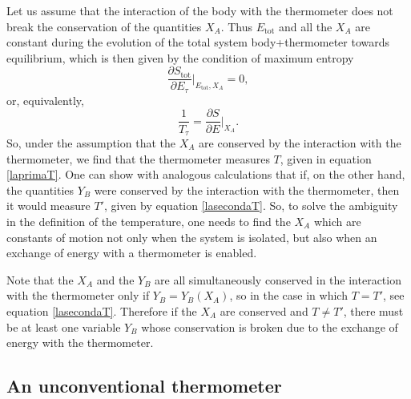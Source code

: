 \documentclass[twocolumn,usenatbib]{mnras2}
\begin{document}
Let us assume that the interaction of the body with the thermometer does not break the conservation of the quantities $X_A$. Thus $E_{\text{tot}}$ and all the $X_A$ are constant during the evolution of the total system body+thermometer towards equilibrium, which is then given by the condition of maximum entropy 
\begin{equation}
\dfrac{\partial S_{\text{tot}}}{\partial E_\tau}\bigg|_{E_{\text{tot}},X_A} =0,
\end{equation}
or, equivalently,
\begin{equation}
\dfrac{1}{T_\tau} = \dfrac{\partial S}{\partial E} \bigg|_{X_A}. 
\end{equation}  
So, under the assumption that the $X_A$ are conserved by the interaction with the thermometer, we find that the thermometer measures $T$, given in equation \eqref{laprimaT}. One can show with analogous calculations that if, on the other hand, the quantities $Y_B$ were conserved by the interaction with the thermometer, then it would measure $T'$, given by equation \eqref{lasecondaT}. So, to solve the ambiguity in the definition of the temperature, one needs to find the $X_A$ which are constants of motion not only when the system is isolated, but also when an exchange of energy with a thermometer is enabled.

Note that the $X_A$ and the $Y_B$ are all simultaneously conserved in the interaction with the thermometer only if $Y_B = Y_B (X_A)$, so in the case in which $T=T'$, see equation \eqref{lasecondaT}. Therefore if the $X_A$ are conserved and $T \neq T'$, there must be at least one variable $Y_B$ whose conservation is broken due to the exchange of energy with the thermometer. 



\subsection{An unconventional thermometer}\label{auncther}
\end{document}
